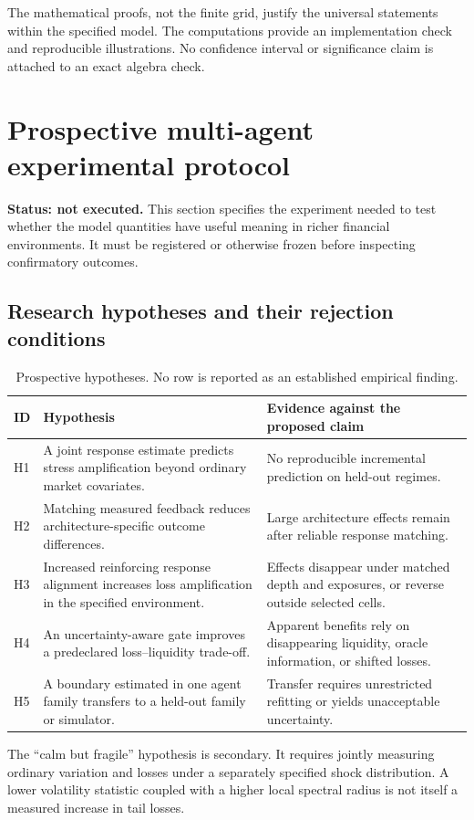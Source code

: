 \documentclass[11pt,a4paper]{article}
\theoremstyle{definition}
\theoremstyle{remark}
\begin{document}
The mathematical proofs, not the finite grid, justify the universal statements within the specified model. The computations provide an implementation check and reproducible illustrations. No confidence interval or significance claim is attached to an exact algebra check.

\section{Prospective multi-agent experimental protocol}
\label{sec:experiments}
\textbf{Status: not executed.} This section specifies the experiment needed to test whether the model quantities have useful meaning in richer financial environments. It must be registered or otherwise frozen before inspecting confirmatory outcomes.

\subsection{Research hypotheses and their rejection conditions}
\begin{table}[htbp]
\centering\small
\caption{Prospective hypotheses. No row is reported as an established empirical finding.}
\label{tab:hypotheses}
\begin{tabularx}{\textwidth}{p{}YY}
\toprule
ID & Hypothesis & Evidence against the proposed claim \\
\midrule
H1 & A joint response estimate predicts stress amplification beyond ordinary market covariates. & No reproducible incremental prediction on held-out regimes.\\
H2 & Matching measured feedback reduces architecture-specific outcome differences. & Large architecture effects remain after reliable response matching.\\
H3 & Increased reinforcing response alignment increases loss amplification in the specified environment. & Effects disappear under matched depth and exposures, or reverse outside selected cells.\\
H4 & An uncertainty-aware gate improves a predeclared loss--liquidity trade-off. & Apparent benefits rely on disappearing liquidity, oracle information, or shifted losses.\\
H5 & A boundary estimated in one agent family transfers to a held-out family or simulator. & Transfer requires unrestricted refitting or yields unacceptable uncertainty.\\
\bottomrule
\end{tabularx}
\end{table}
The ``calm but fragile'' hypothesis is secondary. It requires jointly measuring ordinary variation and losses under a separately specified shock distribution. A lower volatility statistic coupled with a higher local spectral radius is not itself a measured increase in tail losses.
\end{document}
